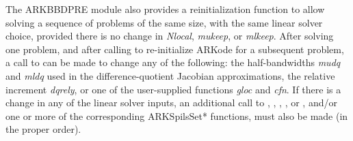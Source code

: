 \documentclass[letterpaper,10pt,english]{sphinxmanual}
\begin{document}
The ARKBBDPRE module also provides a reinitialization function to
allow solving a sequence of problems of the same size, with the same
linear solver choice, provided there is no change in \emph{Nlocal},
\emph{mukeep}, or \emph{mlkeep}. After solving one problem, and after
calling {\hyperref[c_interface/User_callable:ARKodeReInit]{}} to re-initialize ARKode for a
subsequent problem, a call to {\hyperref[c_interface/Preconditioners:ARKBBDPrecReInit]{}} can be made
to change any of the following: the half-bandwidths \emph{mudq} and
\emph{mldq} used in the difference-quotient Jacobian approximations, the
relative increment \emph{dqrely}, or one of the user-supplied functions
\emph{gloc} and \emph{cfn}. If there is a change in any of the linear solver
inputs, an additional call to {\hyperref[c_interface/User_callable:ARKSpgmr]{}},
{\hyperref[c_interface/User_callable:ARKSpbcg]{}}, {\hyperref[c_interface/User_callable:ARKSptfqmr]{}}, {\hyperref[c_interface/User_callable:ARKSpfgmr]{}},
or {\hyperref[c_interface/User_callable:ARKPcg]{}}, and/or one or more of the corresponding
ARKSpilsSet* functions, must also be made (in the proper order).
\end{document}
